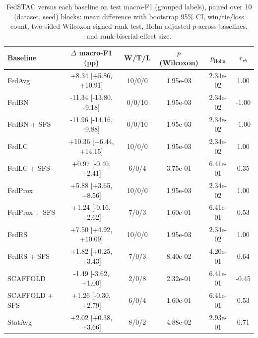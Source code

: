 \begin{table}[t]
\centering
\caption{FedSTAC versus each baseline on test macro-F1 (grouped labels), paired over 10 (dataset, seed) blocks: mean difference with bootstrap 95\% CI, win/tie/loss count, two-sided Wilcoxon signed-rank test, Holm-adjusted $p$ across baselines, and rank-biserial effect size.}
\label{tab:stats_grouped}
\small
\begin{tabular}{lccccc}
\toprule
Baseline & $\Delta$ macro-F1 (pp) & W/T/L & $p$ (Wilcoxon) & $p_{\text{Holm}}$ & $r_{rb}$ \\
\midrule
FedAvg & +8.34 [+5.86, +10.91] & 10/0/0 & 1.95e-03 & 2.34e-02 & 1.00 \\
FedBN & -11.34 [-13.80, -9.18] & 0/0/10 & 1.95e-03 & 2.34e-02 & -1.00 \\
FedBN + SFS & -11.96 [-14.16, -9.88] & 0/0/10 & 1.95e-03 & 2.34e-02 & -1.00 \\
FedLC & +10.36 [+6.44, +14.15] & 10/0/0 & 1.95e-03 & 2.34e-02 & 1.00 \\
FedLC + SFS & +0.97 [-0.40, +2.41] & 6/0/4 & 3.75e-01 & 6.41e-01 & 0.35 \\
FedProx & +5.88 [+3.65, +8.56] & 10/0/0 & 1.95e-03 & 2.34e-02 & 1.00 \\
FedProx + SFS & +1.24 [-0.16, +2.62] & 7/0/3 & 1.60e-01 & 6.41e-01 & 0.53 \\
FedRS & +7.50 [+4.92, +10.09] & 10/0/0 & 1.95e-03 & 2.34e-02 & 1.00 \\
FedRS + SFS & +1.82 [+0.25, +3.43] & 7/0/3 & 8.40e-02 & 4.20e-01 & 0.64 \\
SCAFFOLD & -1.49 [-3.62, +1.00] & 2/0/8 & 2.32e-01 & 6.41e-01 & -0.45 \\
SCAFFOLD + SFS & +1.26 [-0.30, +2.79] & 6/0/4 & 1.60e-01 & 6.41e-01 & 0.53 \\
StatAvg & +2.02 [+0.38, +3.66] & 8/0/2 & 4.88e-02 & 2.93e-01 & 0.71 \\
\bottomrule
\end{tabular}
\end{table}
